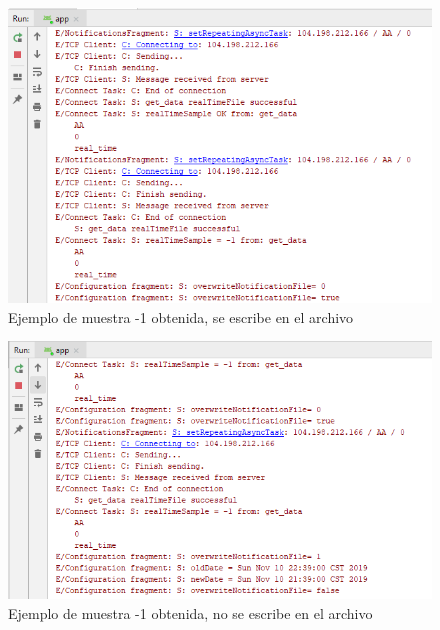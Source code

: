 \begin{figure}[H]
	\centering
	\includegraphics[scale=.7]{Capitulo5/images/muestra1.png}
	\caption{Ejemplo de muestra -1 obtenida, se escribe en el archivo}	
	\label{fig:muestra 1}
\end{figure} 

\begin{figure}[H]
	\centering
	\includegraphics[scale=.7]{Capitulo5/images/muestra2.png}
	\caption{Ejemplo de muestra -1 obtenida, no  se escribe en el archivo}	
	\label{fig:muestra 2}
\end{figure} 


